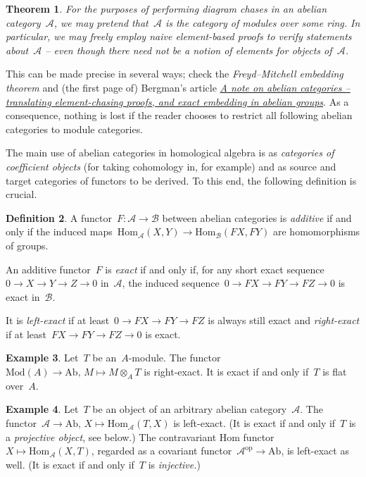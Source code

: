 \documentclass{amsart}
\theoremstyle{definition}
\newtheorem{defn}{Definition}[section]
\newtheorem{ex}[defn]{Example}
\theoremstyle{plain}
\newtheorem{thm}[defn]{Theorem}
\theoremstyle{remark}
\newcommand{\A}{\mathcal{A}}
\newcommand{\B}{\mathcal{B}}
\newcommand{\Hom}{\mathrm{Hom}}
\newcommand{\Ab}{\mathrm{Ab}}
\newcommand{\Mod}{\mathrm{Mod}}
\newcommand{\op}{\mathrm{op}}
\newcommand{\?}{\,{:}\,}
\renewcommand{\_}{\mathpunct{.}\,}
\begin{document}
\begin{thm}For the purposes of performing diagram chases in an abelian
category~$\A$, we may pretend that~$\A$ is the category of modules over some
ring. In particular, we may freely employ naive element-based proofs to verify
statements about~$\A$ -- even though there need not be a notion of elements for
objects of~$\A$.\end{thm}

This can be made precise in several ways; check the \emph{Freyd--Mitchell
embedding theorem} and (the first page of) Bergman's article
\href{https://math.berkeley.edu/~gbergman/papers/unpub/elem-chase.pdf}{\emph{A
note on abelian categories -- translating element-chasing proofs, and exact
embedding in abelian groups}}. As a consequence, nothing is lost if the reader
chooses to restrict all following abelian categories to module categories.

The main use of abelian categories in homological algebra is as
\emph{categories of coefficient objects} (for taking cohomology in, for
example) and as source and target categories of functors to be derived. To this
end, the following definition is crucial.

\begin{defn}A functor~$F : \A \to \B$ between abelian categories is
\emph{additive} if and only if the induced maps~$\Hom_\A(X,Y) \to
\Hom_\B(FX,FY)$ are homomorphisms of groups.

An additive functor~$F$ is
\emph{exact} if and only if, for any short exact sequence~$0 \to X \to Y \to Z
\to 0$ in~$\A$, the induced sequence~$0 \to FX \to FY \to FZ \to 0$ is exact
in~$\B$.

It is \emph{left-exact} if at least~$0 \to FX \to FY \to FZ$ is always still
exact and \emph{right-exact} if at least~$FX \to FY \to FZ \to 0$ is
exact.\end{defn}

\begin{ex}Let~$T$ be an~$A$-module. The functor~$\Mod(A) \to \Ab,\,M
\mapsto M \otimes_A T$ is right-exact. It is exact if and only if~$T$
is flat over~$A$.\end{ex}

\begin{ex}Let~$T$ be an object of an arbitrary abelian category~$\A$. The
functor~$\A \to \Ab,\,X \mapsto \Hom_\A(T,X)$ is left-exact. (It is exact if
and only if~$T$ is a \emph{projective object}, see below.) The contravariant
Hom functor~$X \mapsto \Hom_\A(X,T)$, regarded as a covariant functor~$\A^\op
\to \Ab$, is left-exact as well. (It is exact if and only if~$T$ is
\emph{injective.})\end{ex}
\end{document}
